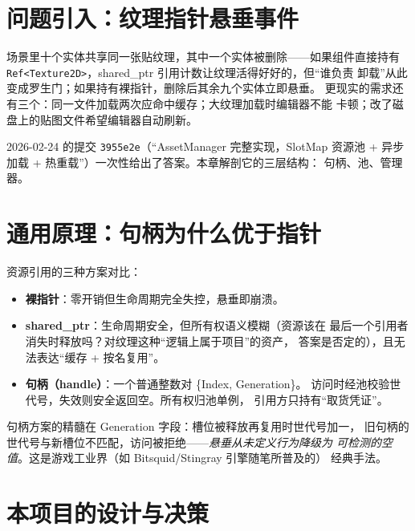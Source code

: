 \section{问题引入：纹理指针悬垂事件}

场景里十个实体共享同一张贴纹理，其中一个实体被删除——如果组件直接持有
\texttt{Ref<Texture2D>}，shared\_ptr 引用计数让纹理活得好好的，但``谁负责
卸载''从此变成罗生门；如果持有裸指针，删除后其余九个实体立即悬垂。
更现实的需求还有三个：同一文件加载两次应命中缓存；大纹理加载时编辑器不能
卡顿；改了磁盘上的贴图文件希望编辑器自动刷新。

2026-02-24 的提交 \texttt{3955e2e}（``AssetManager 完整实现，SlotMap 资源池
+ 异步加载 + 热重载''）一次性给出了答案。本章解剖它的三层结构：
句柄、池、管理器。

\section{通用原理：句柄为什么优于指针}

资源引用的三种方案对比：

\begin{itemize}
  \item \textbf{裸指针}：零开销但生命周期完全失控，悬垂即崩溃。
  \item \textbf{shared\_ptr}：生命周期安全，但所有权语义模糊（资源该在
        最后一个引用者消失时释放吗？对纹理这种``逻辑上属于项目''的资产，
        答案是否定的），且无法表达``缓存 + 按名复用''。
  \item \textbf{句柄（handle）}：一个普通整数对 \{Index, Generation\}。
        访问时经池校验世代号，失效则安全返回空。所有权归池单例，
        引用方只持有``取货凭证''。
\end{itemize}

句柄方案的精髓在 Generation 字段：槽位被释放再复用时世代号加一，
旧句柄的世代号与新槽位不匹配，访问被拒绝——\emph{悬垂从未定义行为降级为
可检测的空值}。这是游戏工业界（如 Bitsquid/Stingray 引擎随笔所普及的）
经典手法。

\section{本项目的设计与决策}

